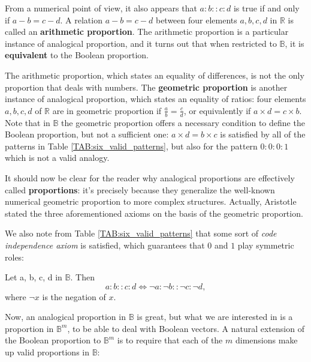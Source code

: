 From a numerical point of view, it also appears that $a:b::c:d$ is true if and
only if $a - b = c - d$. A relation $a - b = c - d$ between four elements $a,
b, c, d$ in $\mathbb{R}$ is called an \textbf{arithmetic proportion}.
The arithmetic proportion is a particular instance of analogical proportion,
and it turns out that when restricted to $\mathbb{B}$, it is
\textbf{equivalent} to the Boolean proportion.

The arithmetic proportion, which states an equality of differences, is not the
only proportion that deals with numbers. The \textbf{geometric proportion} is
another instance of analogical proportion, which states an equality of ratios:
four elements $a, b, c, d$ of $\mathbb{R}$ are in geometric proportion if
$\frac{a}{b} = \frac{c}{d}$, or equivalently if $a\times d = c\times b$.
Note that in $\mathbb{B}$ the geometric proportion offers a necessary condition
to define the Boolean proportion, but not a sufficient one: $a \times d =
b\times c$ is satisfied by all of the patterns in Table
\ref{TAB:six_valid_patterns}, but also for the pattern $0: 0: 0: 1$ which is
not a valid analogy.

It should now be clear for the reader why analogical proportions are
effectively called \textbf{proportions}: it's precisely because they generalize
the well-known numerical geometric proportion to more complex structures.
Actually, Aristotle stated the three aforementioned axioms on the basis of the
geometric proportion.

We also note from Table \ref{TAB:six_valid_patterns} that some sort of {\it
code independence axiom} is satisfied, which guarantees that $0$ and $1$ play
symmetric roles:

\begin{property}
  Let a, b, c, d in $\mathbb{B}$. Then
  $$a : b :: c : d \iff \neg a :  \neg b ::  \neg c :  \neg d,$$
  where $\neg x$ is the negation of $x$.
\end{property}

Now, an analogical proportion in $\mathbb{B}$ is great, but what we are
interested in is a proportion in $\mathbb{B}^m$, to be able to deal with
Boolean vectors. A natural extension of the Boolean proportion to
$\mathbb{B}^m$ is to require that each of the $m$ dimensions make up valid
proportions in $\mathbb{B}$:

